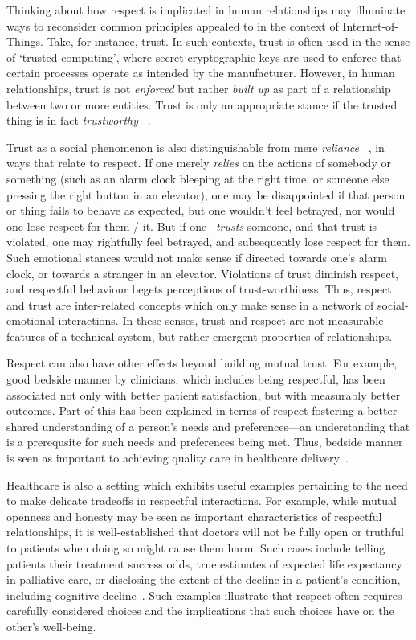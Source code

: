\documentclass{IETpaper}
\begin{document}
Thinking about how respect is implicated in human relationships may illuminate ways to reconsider common principles appealed to in the context of Internet-of-Things. Take, for instance, trust. In such contexts, trust is often used in the sense of `trusted computing', where secret cryptographic keys are used to enforce that certain processes operate as intended by the manufacturer. However, in human relationships, trust is not \emph{enforced} but rather \emph{built up} as part of a relationship between two or more entities. Trust is only an appropriate stance if the trusted thing is in fact \emph{trustworthy} ~\cite{o2014trust}.

Trust as a social phenomenon is also distinguishable from mere \emph{reliance} ~\cite{baier1986trust}, in ways that relate to respect. If one merely \emph{relies} on the actions of somebody or something (such as an alarm clock bleeping at the right time, or someone else pressing the right button in an elevator), one may be disappointed if that person or thing fails to behave as expected, but one wouldn't feel betrayed, nor would one lose respect for them / it. But if one ~\emph{trusts} someone, and that trust is violated, one may rightfully feel betrayed, and subsequently lose respect for them. Such emotional stances would not make sense if directed towards one's alarm clock, or towards a stranger in an elevator. Violations of trust diminish respect, and respectful behaviour begets perceptions of trust-worthiness. Thus, respect and trust are inter-related concepts which only make sense in a network of social-emotional interactions. In these senses, trust and respect are not measurable features of a technical system, but rather emergent properties of relationships.

Respect can also have other effects beyond building mutual trust. For example, good bedside manner by clinicians, which includes being respectful, has been associated not only with better patient satisfaction, but with measurably better outcomes.  Part of this has been explained in terms of respect fostering a better shared understanding of a person's needs and preferences---an understanding that is a prerequsite for such needs and preferences being met. Thus, bedside manner is seen as important to achieving quality care in healthcare delivery~\cite{weissmann2006role}.  

Healthcare is also a setting which exhibits useful examples pertaining to the need to make delicate tradeoffs in  respectful interactions. For example, while mutual openness and honesty may be seen as important characteristics of respectful relationships, it is well-established that doctors will not be fully open or truthful to patients when doing so might cause them harm. Such cases include telling patients their treatment success odds, true estimates of expected life expectancy in palliative care, or disclosing the extent of the decline in a patient's condition, including cognitive decline~\cite{matthias2015robot}.  Such examples illustrate that respect often requires carefully considered choices and the implications that such choices have on the other's well-being.
\end{document}
